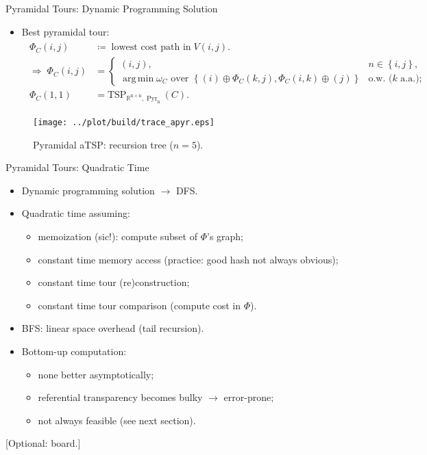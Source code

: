 \documentclass[
  size=8pt,
  style=klope,
  paper=screen,
  mode=present,
  nohandoutpagebreaks,
  pauseslide,
  hlsections,
  fleqn,
]{powerdot}
\DeclareMathOperator*{\argmin}{arg\,min}
\def\board{{\color{green} [Optional: board.]}}
\begin{document}
\begin{slide}[toc=]{Pyramidal Tours: Dynamic Programming Solution}
\begin{itemize}
  \item
    Best pyramidal tour:
    \begin{align}
    \begin{split}
      \Phi_C\left(i,j\right) & \coloneqq \; \text{lowest cost path in} \; V\left(i,j\right).
    \\
    \Rightarrow \;
    \Phi_C\left(i,j\right) & =
    \begin{cases}
      \left(i,j\right), & n \in \left\{i,j\right\}, \\
      \argmin \omega_C \text{ over }
      \left\{
      \left(i\right) \oplus \Phi_C\left(k,j\right)
      ,
      \Phi_C\left(i,k\right) \oplus \left(j\right)
      \right\}
      & \text{o.w.\ ($k$ a.a.)};
    \end{cases}
    \\
    \Phi_C\left(1,1\right) & = \operatorname{TSP_{\mathbb{R}^{n \times n},\operatorname{Pyr}_n}}\left(C\right).
    \end{split}
  \end{align}
\end{itemize}
\vspace{-3mm}
\begin{figure}[H]
  \centering
  \texttt{[image: ../plot/build/trace\_apyr.eps]}
  \caption{Pyramidal aTSP: recursion tree ($n = 5$).}
\end{figure}
\end{slide}

\begin{slide}[toc=Dynamic Programming${,}$ Recursion and Complexity]{Pyramidal Tours: Quadratic Time}
  \begin{itemize}
  \item
  Dynamic programming solution $\rightarrow$ DFS.
  \item
  Quadratic time assuming:
  \begin{itemize}
    \item memoization (sic!): compute subset of $\Phi$'s graph;
    \item constant time memory access (practice: good hash not always obvious);
    \item constant time tour (re)construction;
    \item constant time tour comparison (compute cost in $\Phi$).
  \end{itemize}
  \item
  BFS: linear space overhead (tail recursion).
  \item
  Bottom-up computation:
  \begin{itemize}
    \item
    none better asymptotically;
    \item
    referential transparency becomes bulky $\rightarrow$ error-prone;
    \item
    not always feasible (see next section).
  \end{itemize}
  \end{itemize}
\board
\end{slide}
\end{document}
